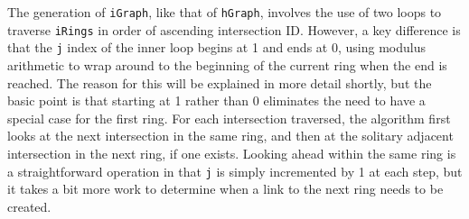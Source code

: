 \documentclass[pageno]{jpaper}
\begin{document}
\begin{doublespacing}
The generation of \lstinline$iGraph$, like that of \lstinline$hGraph$, involves the use of two loops to traverse \lstinline$iRings$ in order of ascending intersection ID. However, a key difference is that the \lstinline$j$ index of the inner loop begins at 1 and ends at 0, using modulus arithmetic to wrap around to the beginning of the current ring when the end is reached. The reason for this will be explained in more detail shortly, but the basic point is that starting at 1 rather than 0 eliminates the need to have a special case for the first ring. For each intersection traversed, the algorithm first looks at the next intersection in the same ring, and then at the solitary adjacent intersection in the next ring, if one exists. Looking ahead within the same ring is a straightforward operation in that \lstinline$j$ is simply incremented by 1 at each step, but it takes a bit more work to determine when a link to the next ring needs to be created.


\end{doublespacing}
\end{document}
